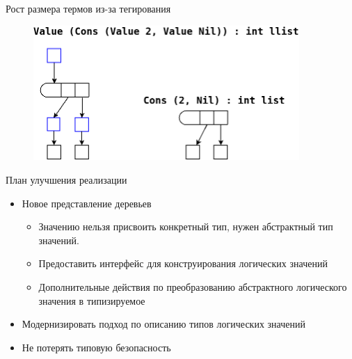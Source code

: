 \documentclass[10pt, mathserif]{beamer}
\theoremstyle{definition}
\begin{document}
\begin{frame}[fragile]{Рост размера термов из-за тегирования}
\begin{figure}
\centering
\includegraphics[width=0.9\textwidth]{img4.png}
\end{figure}
\end{frame}

\begin{frame}[fragile]{План улучшения реализации}
  \begin{itemize}
  \item Новое представление деревьев
    \begin{itemize}
      \item{Значению нельзя присвоить конкретный тип, нужен абстрактный тип значений.}
      \item{Предоставить интерфейс для конструирования логических значений}
      \item{Дополнительные действия по преобразованию абстрактного логического значения в типизируемое}
    \end{itemize}
  \item Модернизировать подход по описанию типов логических значений
  \item Не потерять типовую безопасность
  \end{itemize}
\end{frame}
\end{document}
